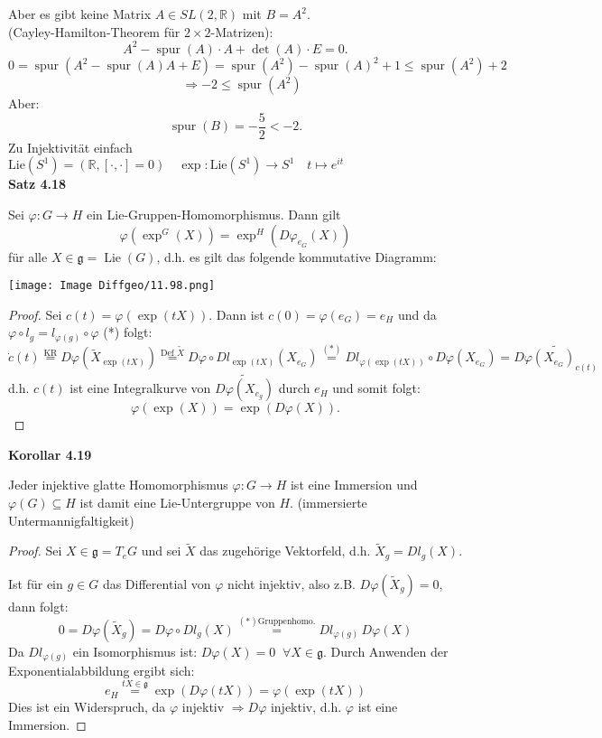 \documentclass[fleqn, 12pt, letterpaper]{article}
\newcommand{\txt}[1]{\text{#1}}
\begin{document}
Aber es gibt keine Matrix \( A \in SL(2, \mathbb{R}) \) mit \( B = A^2 \).\\
(Cayley-Hamilton-Theorem für \( 2 \times 2 \)-Matrizen):
\[
A^2 - \operatorname{spur}(A) \cdot A + \det(A) \cdot E = 0.
\]
\[
0 = \operatorname{spur} \left(A^2 - \operatorname{spur}(A)A + E \right)=\operatorname{spur}(A^2)-\operatorname{spur}(A)^2+1\leq\operatorname{spur}(A^2)+2
\]
\[
\quad \Longrightarrow-2 \leq \operatorname{spur}(A^2)
\]
Aber:
\[
\operatorname{spur}(B) = -\frac{5}{2}<-2  .
\]
Zu Injektivität einfach $\mathrm{Lie}(S^1)=(\mathbb{R},[\cdot,\cdot]=0)\quad \exp:\mathrm{Lie}(S^1)\rightarrow S^1 \quad t\mapsto e^{it}$\\

\textbf{Satz 4.18}

Sei $\varphi: G \to H$ ein Lie-Gruppen-Homomorphismus. Dann gilt 
\[
\varphi(\exp^G(X))=\exp^H(D\varphi_{e_G}(X))
\]
für alle $X \in \mathfrak{g} = \operatorname{Lie}(G)$, d.h. es gilt das folgende kommutative Diagramm:

\texttt{[image: Image Diffgeo/11.98.png]}

\begin{proof}
    Sei $c(t) = \varphi(\exp(tX))$. Dann ist $c(0) = \varphi(e_G) = e_H$ und da $\varphi \circ l_g = l_{\varphi(g)} \circ \varphi$ (*) folgt:
\[
\dot{c}(t) \overset{\txt{KR}}{=} D\varphi\left( \widetilde{X}_{\exp(tX)} \right) 
\overset{\txt{Def }\tilde{X}}{=}D\varphi \circ D l_{\exp(tX)} \left(X_{e_G}\right)
\overset{(*)}{=}D l_{\varphi(\exp(tX))} \circ D\varphi \left(X_{e_G}\right)
= \widetilde{D\varphi(X_{e_G}) _{c(t)}}
\]
d.h. $c(t)$ ist eine Integralkurve von $\widetilde{D\varphi(X_{e_g})}$ durch $e_H$ und somit folgt:
\[
\varphi(\exp(X)) = \exp(D\varphi(X)).
\]
\end{proof}

\textbf{Korollar 4.19}

Jeder injektive glatte Homomorphismus $\varphi: G \to H$ ist eine Immersion und $\varphi(G) \subseteq H$ ist damit eine Lie-Untergruppe von $H$. (immersierte Untermannigfaltigkeit)

\begin{proof}
    Sei $X \in \mathfrak{g} = T_e G$ und sei $\tilde{X}$ das zugehörige Vektorfeld, d.h. $\tilde{X}_g = Dl_g(X)$. 

\medskip

Ist für ein $g \in G$ das Differential von $\varphi$ nicht injektiv, also z.B. $D\varphi(\tilde{X}_g) = 0$, dann folgt:
\[
0 = D\varphi(\tilde{X}_g) = D\varphi \circ D l_g (X) \overset{(*) \txt{Gruppenhomo.}}{=} D l_{\varphi(g)} \, D\varphi (X)
\]
Da $Dl_{\varphi(g)}$ ein Isomorphismus ist: $D\varphi(X)=0\;\;\forall X\in \mathfrak{g}$.
Durch Anwenden der Exponentialabbildung ergibt sich:
\[
e_H  \overset{tX\in \mathfrak{g}}{=} \exp(D\varphi(tX)) = \varphi(\exp(tX))
\]
Dies ist ein Widerspruch, da $\varphi$ injektiv $\Rightarrow D\varphi$ injektiv, d.h. $\varphi$ ist eine Immersion.
\end{proof}
\end{document}
